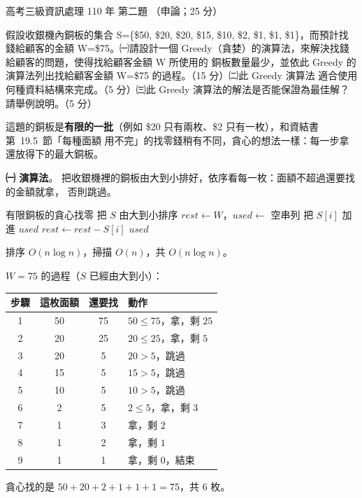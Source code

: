 \begin{pastexam}[label={px:gk3-110-ds-02}]{高考三級資訊處理 110 年 第二題}
（申論；25 分）

假設收銀機內銅板的集合 S=\{\$50, \$20, \$20, \$15, \$10, \$2, \$1, \$1, \$1\}，而預計找錢給顧客的金額
W=\$75。㈠請設計一個 Greedy（貪婪）的演算法，來解決找錢給顧客的問題，使得找給顧客金額 W 所使用的
銅板數量最少，並依此 Greedy 的演算法列出找給顧客金額 W=\$75 的過程。（15 分）㈡此 Greedy 演算法
適合使用何種資料結構來完成。（5 分）㈢此 Greedy 演算法的解法是否能保證為最佳解？請舉例說明。（5 分）
\end{pastexam}

\begin{pastsoln}
這題的銅板是\textbf{有限的一批}（例如 \$20 只有兩枚、\$2 只有一枚），和資結書第~19.5~節「每種面額
用不完」的找零錢稍有不同，貪心的想法一樣：每一步拿還放得下的最大銅板。

\textbf{㈠ 演算法}。 把收銀機裡的銅板由大到小排好，依序看每一枚：面額不超過還要找的金額就拿，
否則跳過。
\begin{pseudo}{有限銅板的貪心找零}
 
    \State 把 $S$ 由大到小排序
    \State $\mathit{rest} \gets W$，$\mathit{used} \gets$ 空串列
         
            \State 把 $S[i]$ 加進 $\mathit{used}$
            \State $\mathit{rest} \gets \mathit{rest} - S[i]$
        \EndIf
            \State \Return $\mathit{used}$
        \EndIf
    \EndFor
    \State \Return \NIL {}
\EndFunction
\end{pseudo}
排序 $O(n \log n)$，掃描 $O(n)$，共 $O(n \log n)$。

$W = 75$ 的過程（$S$ 已經由大到小）：
\begin{center}
\small
\begin{tabular}{cccl}
\toprule
步驟 & 這枚面額 & 還要找 & 動作 \\
\midrule
1 & 50 & 75 & $50 \le 75$，拿，剩 $25$ \\
2 & 20 & 25 & $20 \le 25$，拿，剩 $5$ \\
3 & 20 & 5 & $20 > 5$，跳過 \\
4 & 15 & 5 & $15 > 5$，跳過 \\
5 & 10 & 5 & $10 > 5$，跳過 \\
6 & 2 & 5 & $2 \le 5$，拿，剩 $3$ \\
7 & 1 & 3 & 拿，剩 $2$ \\
8 & 1 & 2 & 拿，剩 $1$ \\
9 & 1 & 1 & 拿，剩 $0$，結束 \\
\bottomrule
\end{tabular}
\end{center}
貪心找的是 $50 + 20 + 2 + 1 + 1 + 1 = 75$，共 $6$ 枚。


\end{pastsoln}
